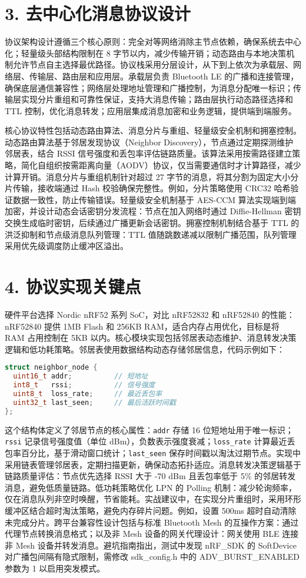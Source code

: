 \chapter{3. 去中心化消息协议设计}
协议架构设计遵循三个核心原则：完全对等网络消除主节点依赖，确保系统去中心化；轻量级头部结构限制在 8 字节以内，减少传输开销；动态路由与本地决策机制允许节点自主选择最优路径。协议栈采用分层设计，从下到上依次为承载层、网络层、传输层、路由层和应用层。承载层负责 Bluetooth LE 的广播和连接管理，确保底层通信兼容性；网络层处理地址管理和广播控制，为消息分配唯一标识；传输层实现分片重组和可靠性保证，支持大消息传输；路由层执行动态路径选择和 TTL 控制，优化消息转发；应用层集成消息加密和业务逻辑，提供端到端服务。\par
核心协议特性包括动态路由算法、消息分片与重组、轻量级安全机制和拥塞控制。动态路由算法基于邻居发现协议（Neighbor Discovery），节点通过定期探测维护邻居表，结合 RSSI 信号强度和丢包率评估链路质量。该算法采用按需路径建立策略，简化自组织按需距离向量（AODV）协议，仅当需要通信时才计算路径，减少计算开销。消息分片与重组机制针对超过 27 字节的消息，将其分割为固定大小分片传输，接收端通过 Hash 校验确保完整性。例如，分片策略使用 CRC32 哈希验证数据一致性，防止传输错误。轻量级安全机制基于 AES-CCM 算法实现端到端加密，并设计动态会话密钥分发流程：节点在加入网络时通过 Diffie-Hellman 密钥交换生成临时密钥，后续通过广播更新会话密钥。拥塞控制机制结合基于 TTL 的洪泛抑制和节点级消息队列管理：TTL 值随跳数递减以限制广播范围，队列管理采用优先级调度防止缓冲区溢出。\par
\chapter{4. 协议实现关键点}
硬件平台选择 Nordic nRF52 系列 SoC，对比 nRF52832 和 nRF52840 的性能：nRF52840 提供 1MB Flash 和 256KB RAM，适合内存占用优化，目标是将 RAM 占用控制在 5KB 以内。核心模块实现包括邻居表动态维护、消息转发决策逻辑和低功耗策略。邻居表使用数据结构动态存储邻居信息，代码示例如下：\par
\begin{lstlisting}[language=c]
struct neighbor_node {
  uint16_t addr;          // 短地址
  int8_t   rssi;          // 信号强度
  uint8_t  loss_rate;     // 最近丢包率
  uint32_t last_seen;     // 最后活跃时间戳
};
\end{lstlisting}
这个结构体定义了邻居节点的核心属性：\texttt{addr} 存储 16 位短地址用于唯一标识；\texttt{rssi} 记录信号强度值（单位 dBm），负数表示强度衰减；\texttt{loss\_{}rate} 计算最近丢包率百分比，基于滑动窗口统计；\texttt{last\_{}seen} 保存时间戳以淘汰过期节点。实现中采用链表管理邻居表，定期扫描更新，确保动态拓扑适应。消息转发决策逻辑基于链路质量评估：节点优先选择 RSSI 大于 -70 dBm 且丢包率低于 5\%{} 的邻居转发消息，避免低质量链路。低功耗策略优化 LPN 的 Polling 机制：减少轮询频率，仅在消息队列非空时唤醒，节省能耗。实战建议中，在实现分片重组时，采用环形缓冲区结合超时淘汰策略，避免内存碎片问题。例如，设置 500ms 超时自动清除未完成分片。跨平台兼容性设计包括与标准 Bluetooth Mesh 的互操作方案：通过代理节点转换消息格式；以及非 Mesh 设备的网关代理设计：网关使用 BLE 连接非 Mesh 设备并转发消息。避坑指南指出，测试中发现 nRF\_{}SDK 的 SoftDevice 对广播包间隔有隐式限制，需修改 sdk\_{}config.h 中的 ADV\_{}BURST\_{}ENABLED 参数为 1 以启用突发模式。\par
